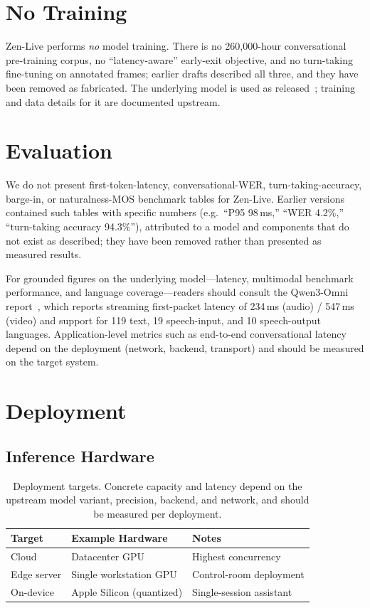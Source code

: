 \documentclass[11pt,a4paper]{article}
\begin{document}
\section{No Training}

Zen-Live performs \emph{no} model training. There is no 260,000-hour conversational
pre-training corpus, no ``latency-aware'' early-exit objective, and no turn-taking
fine-tuning on annotated frames; earlier drafts described all three, and they have been
removed as fabricated. The underlying model is used as released~\cite{qwen3omni};
training and data details for it are documented upstream.

\section{Evaluation}

We do not present first-token-latency, conversational-WER, turn-taking-accuracy,
barge-in, or naturalness-MOS benchmark tables for Zen-Live. Earlier versions contained
such tables with specific numbers (e.g.\ ``P95 98\,ms,'' ``WER 4.2\%,'' ``turn-taking
accuracy 94.3\%''), attributed to a model and components that do not exist as
described; they have been removed rather than presented as measured results.

For grounded figures on the underlying model---latency, multimodal benchmark
performance, and language coverage---readers should consult the Qwen3-Omni
report~\cite{qwen3omni}, which reports streaming first-packet latency of 234\,ms (audio)
/ 547\,ms (video) and support for 119 text, 19 speech-input, and 10 speech-output
languages. Application-level metrics such as end-to-end conversational latency depend on
the deployment (network, backend, transport) and should be measured on the target
system.

\section{Deployment}

\subsection{Inference Hardware}

\begin{table}[H]
\centering
\caption{Deployment targets. Concrete capacity and latency depend on the upstream
model variant, precision, backend, and network, and should be measured per deployment.}
\begin{tabular}{lll}
\toprule
\textbf{Target} & \textbf{Example Hardware} & \textbf{Notes} \\
\midrule
Cloud & Datacenter GPU & Highest concurrency \\
Edge server & Single workstation GPU & Control-room deployment \\
On-device & Apple Silicon (quantized) & Single-session assistant \\
\bottomrule
\end{tabular}
\end{table}
\end{document}
